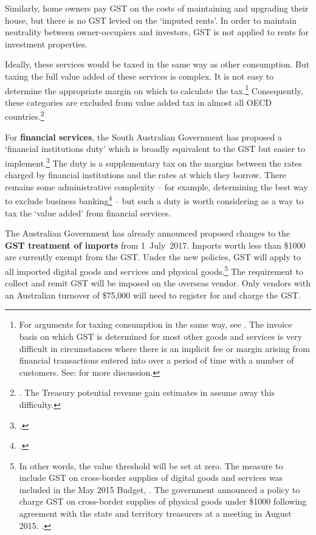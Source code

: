 Similarly, home owners pay GST on the costs of maintaining and upgrading their house, but there is no GST levied on the ‘imputed rents’. In order to maintain neutrality between owner-occupiers and investors, GST is not applied to rents for investment properties.

Ideally, these services would be taxed in the same way as other consumption.  But taxing the full value added of these services is complex. It is not easy to determine the appropriate margin on which to calculate the tax.\footnote{For arguments for taxing consumption in the same way, see \textcites{Freebairn2013}[][52]{HenryTaxReview2010}. The invoice basis on which GST is determined for most other goods and services is very difficult in circumstances where there is an implicit fee or margin arising from financial transactions entered into over a period of time with a number of customers. See: \textcites{Evans2015}{Davis2015} for more discussion.}  
Consequently, these categories are excluded from value added tax in almost all OECD countries.\footnote{\textcite[][21]{OECD2014}. The Treasury potential revenue gain estimates in  assume away this difficulty.}  

For \textbf{financial services}, the South Australian Government has proposed a ‘financial institutions duty’ which is broadly equivalent to the GST but easier to implement.\footcites{Evans2015}{Weatherill2015}  The duty is a supplementary tax on the margins between the rates charged by financial institutions and the rates at which they borrow. There remains some administrative complexity – for example, determining the best way to exclude business banking\footcite{Davis2015}  – but such a duty is worth considering as a way to tax the ‘value added’ from financial services. 

The Australian Government has already announced proposed changes to the \textbf{GST treatment of imports} from 1~July~2017. Imports worth less than \$1000 are currently exempt from the GST. Under the new policies, GST will apply to all imported digital goods and services and physical goods.\footnote{In other words, the value threshold will be set at zero. The measure to include GST on cross-border supplies of digital goods and services was included in the May 2015 Budget,
\textcite[][20]{Treasury2015BudgetPapers201516}. The government announced a policy to charge GST on cross-border supplies of physical goods under \$1000 following agreement with the state and territory treasurers at a meeting in August 2015. \textcite{Hockey2015--GST-import-threshold}.}  The requirement to collect and remit GST will be imposed on the overseas vendor. Only vendors with an Australian turnover of \$75,000 will need to register for and charge the GST.

